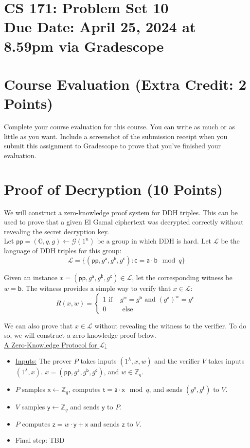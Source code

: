 \documentclass[11pt]{article}
\newcommand{\cL}{\mathcal{L}}
\newcommand{\GG}{\mathbb{G}}
\newcommand{\pp}{\mathsf{pp}}
\newcommand{\ZZ}{\mathbb{Z}}
\newcommand{\sfa}{\mathsf{a}}
\newcommand{\sfb}{\mathsf{b}}
\newcommand{\sfc}{\mathsf{c}}
\newcommand{\sft}{\mathsf{t}}
\newcommand{\sfx}{\mathsf{x}}
\newcommand{\sfy}{\mathsf{y}}
\newcommand{\sfz}{\mathsf{z}}
\newcommand{\secp}{\lambda}
\newcommand{\duedate}{April 25, 2024 at 8.59pm via Gradescope}
\numberwithin{equation}{section}
\begin{document}
\section*{CS 171: Problem Set 10\\ {\small Due Date: \duedate} }


\section{Course Evaluation (Extra Credit: 2 Points)}
Complete your course evaluation for this course. You can write as much or as little as you want. Include a screenshot of the submission receipt when you submit this assignment to Gradescope to prove that you've finished your evaluation.\pagebreak


\section{Proof of Decryption (10 Points)}
We will construct a zero-knowledge proof system for DDH triples. This can be used to prove that a given El Gamal ciphertext was decrypted correctly without revealing the secret decryption key.\\

Let $\pp = (\GG, q, g) \leftarrow \mathcal{G}(1^n)$ be a group in which DDH is hard. Let $\cL$ be the language of DDH triples for this group:
\[\cL = \{(\pp, g^\sfa, g^\sfb, g^\sfc) : \sfc = \sfa \cdot \sfb \mod q\}\]

Given an instance $x = (\pp, g^\sfa, g^\sfb, g^\sfc) \in \cL$, let the corresponding witness be $w = \sfb$. The witness provides a simple way to verify that $x \in \cL$:
\[R(x, w) = 
\begin{cases}
    1 \text{ if } & g^{w} = g^\sfb \text{ and } (g^\sfa)^w = g^{\sfc}\\
    0 & \text{ else }
\end{cases}\]

We can also prove that $x \in \cL$ without revealing the witness to the verifier. To do so, we will construct a zero-knowledge proof below.\\

\noindent\underline{A Zero-Knowledge Protocol for $\cL$:}
\begin{itemize}
    \item \underline{Inputs:} The prover $P$ takes inputs $(1^\secp, x, w)$ and the verifier $V$ takes inputs $(1^\secp, x)$. $x = (\pp, g^\sfa, g^\sfb, g^\sfc)$, and $w \in \ZZ_q$.
    \item $P$ samples $\sfx \leftarrow \ZZ_q$, computes $\sft = \sfa \cdot \sfx \mod q$, and sends $(g^\sfx,g^{\sft})$ to $V$. 
    \item $V$ samples $\sfy \leftarrow \mathbb{Z}_q$ and sends $\sfy$ to $P$.
    \item $P$ computes $\sfz = w \cdot \sfy + \sfx$ and sends $\sfz$ to $V$.
    \item Final step: TBD
\end{itemize}
\end{document}
